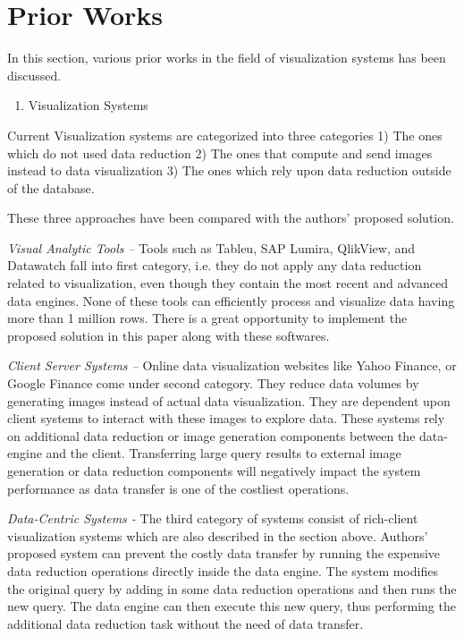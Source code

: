 \section{Prior Works}
In this section, various prior works in the field of visualization systems has been discussed.

\begin{enumerate}
	\item Visualization Systems
\end{enumerate}
Current Visualization systems are categorized into three categories 1) The ones which do not used data reduction 2) The ones that compute and send images instead to data visualization 3) The ones which rely upon data reduction outside of the database.

These three approaches have been compared with the authors’ proposed solution.\newline


\textit{Visual Analytic Tools – }
Tools such as Tableu, SAP Lumira, QlikView, and Datawatch fall into first category, i.e. they do not apply any data reduction related to visualization, even though they contain the most recent and advanced data engines. None of these tools can efficiently process and visualize data having more than 1 million rows. There is a great opportunity to implement the proposed solution in this paper along with these softwares. \newline


\textit{Client Server Systems –  }
Online data visualization websites like Yahoo Finance, or Google Finance come under second category. They reduce data volumes by generating images instead of actual data visualization. They are dependent upon client systems to interact with these images to explore data. These systems rely on additional data reduction or image generation components between the data-engine and the client. Transferring large query results to external image generation or data reduction components will negatively impact the system performance as data transfer is one of the costliest operations. \newline



\textit{Data-Centric Systems -}
The third category of systems consist of rich-client visualization systems which are also described in the section above. Authors’ proposed system can prevent the costly data transfer by running the expensive data reduction operations directly inside the data engine. The system modifies the original query by adding in some data reduction operations and then runs the new query. The data engine can then execute this new query, thus performing the additional data reduction task without the need of data transfer.\newline



